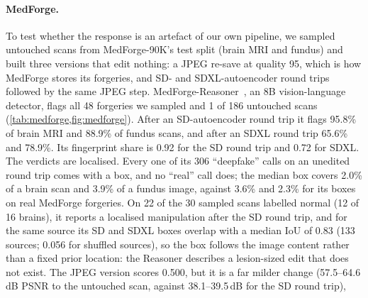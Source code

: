 \paragraph{MedForge.}
To test whether the response is an artefact of our own pipeline, we sampled untouched scans from MedForge-90K's test split (brain MRI and fundus) and built three versions that edit nothing: a JPEG re-save at quality 95, which is how MedForge stores its forgeries, %
and SD- and SDXL-autoencoder round trips followed by the same JPEG step.
MedForge-Reasoner~\cite{chen2026medforge}, an 8B vision-language detector, %
flags all 48 forgeries we sampled and 1 of 186 untouched scans (\cref{tab:medforge,fig:medforge}). %
After an SD-autoencoder round trip it flags 95.8\% of brain MRI and 88.9\% of fundus scans, %
and after an SDXL round trip 65.6\% and 78.9\%. %
Its fingerprint share is 0.92 for the SD round trip and 0.72 for SDXL. %
The verdicts are localised.
Every one of its 306 ``deepfake'' calls on an unedited round trip comes with a box, and no ``real'' call does; %
the median box covers 2.0\% of a brain scan and 3.9\% of a fundus image, %
against 3.6\% and 2.3\% for its boxes on real MedForge forgeries. %
On 22 of the 30 sampled scans labelled normal (12 of 16 brains), it reports a localised manipulation after the SD round trip, %
and for the same source its SD and SDXL boxes overlap with a median IoU of 0.83 (133 sources; 0.056 for shuffled sources), %
so the box follows the image content rather than a fixed prior location: the Reasoner describes a lesion-sized edit that does not exist.
The JPEG version scores 0.500, %
but it is a far milder change (57.5--64.6\,dB PSNR to the untouched scan, against 38.1--39.5\,dB for the SD round trip), %

